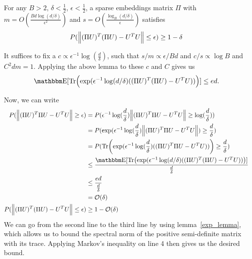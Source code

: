 \begin{theorem}
    For any $B > 2$, $\delta < \frac{1}{2}$, $\epsilon < \frac{1}{2}$, a sparse embeddings matrix $\Pi$ with $m = O(\frac{Bd\log(d/\delta)}{\epsilon^2})$ and $s = O(\frac{\log_B(d/\delta)}{\epsilon})$ satisfies 
    \begin{equation}
        P(\norm{(\Pi U) ^ T (\Pi U) - U^T U} \leq \epsilon) \geq 1 - \delta
    \end{equation}
\label{main_theorem}
\end{theorem}
\begin{proofsketch}
    It suffices to fix a $c \propto \epsilon^{-1}\log(\frac{d}{\delta})$, such that $s/m \propto \epsilon / Bd$ and $c/s \propto \log B$ and $C^2 d m = 1$. Applying the above lemma to these $c$ and $C$ gives us 
    $$
    \av[\tr{\exp(\epsilon^{-1}\log(d/\delta)((\Pi U)^T (\Pi U) - U^TU) )}] \leq e d.
    $$

Now, we can write
\begin{align*}
        P(\norm{(\Pi U)^T \Pi U - U^TU} \geq \epsilon) & = P(\epsilon^{-1}\log(\frac{d}{\delta}) \norm{(\Pi U)^T \Pi U - U^TU} \geq \log(\frac{d}{\delta})) \\
        & = P(\exp(\epsilon^{-1}\log(\frac{d}{\delta}) \norm{(\Pi U)^T \Pi U - U^TU}) \geq \frac{d}{\delta}) \\
        & = P(\tr{\exp(\epsilon^{-1}\log(\frac{d}{\delta}) ((\Pi U)^T \Pi U - U^TU))} \geq \frac{d}{\delta}) \\
        & \leq \frac{\av[\tr{\exp(\epsilon^{-1}\log(d/\delta)((\Pi U)^T (\Pi U) - U^TU) )}]}{\frac{d}{\delta}} \\
        & \leq \frac{ed}{\frac{d}{\delta}} \\
        & = \calO({\delta})
        \\
          P(\norm{(\Pi U) ^ T (\Pi U) - U^T U} \leq \epsilon) & \geq 1 -  \calO({\delta})
\end{align*}
We can go from the second line to the third line by using lemma~\ref{exp_lemma}, which allows us to bound the spectral norm of the positive semi-definite matrix with its trace. Applying Markov's inequality on line 4 then gives us the desired bound.
 

\end{proofsketch}



